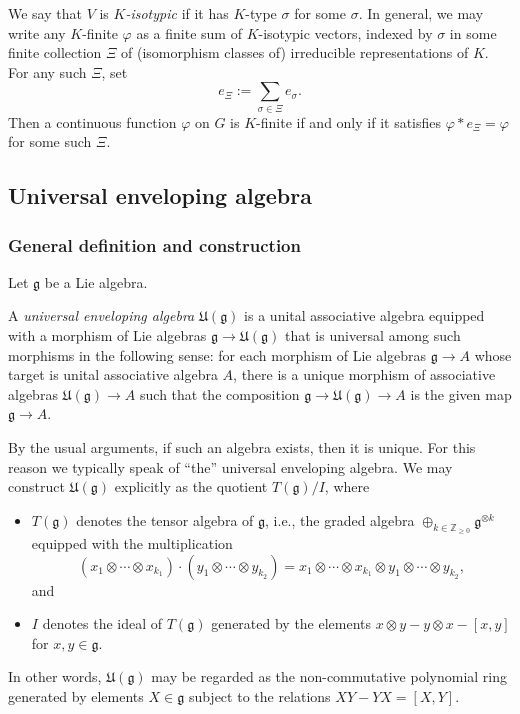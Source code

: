 \documentclass[reqno]{amsart} 
\begin{document}
We say that $V$ is \emph{$K$-isotypic} if it has $K$-type $\sigma$ for some $\sigma$.  In general, we may write any $K$-finite $\varphi$ as a finite sum of $K$-isotypic vectors, indexed by $\sigma$ in some finite collection $\Xi$ of (isomorphism classes of) irreducible representations of $K$.  For any such $\Xi$, set
\begin{equation*}
  e _{\Xi } := \sum _{\sigma \in \Xi } e _\sigma.
\end{equation*}
Then a continuous function $\varphi$ on $G$ is $K$-finite if and only if it satisfies $\varphi \ast e _{\Xi } = \varphi$ for some such $\Xi$.

\subsection{Universal enveloping algebra}\label{sec:univ-envel-algebra}

\subsubsection{General definition and construction}\label{sec:gener-defin-constr}

Let $\mathfrak{g}$ be a Lie algebra.
\begin{definition}
  A \emph{universal enveloping algebra} $\mathfrak{U}(\mathfrak{g})$ is a unital associative algebra equipped with a morphism of Lie algebras $\mathfrak{g} \rightarrow \mathfrak{U}(\mathfrak{g})$ that is universal among such morphisms in the following sense: for each morphism of Lie algebras $\mathfrak{g} \rightarrow A$ whose target is unital associative algebra $A$, there is a unique morphism of associative algebras $\mathfrak{U}(\mathfrak{g}) \rightarrow A$ such that the composition $\mathfrak{g} \rightarrow \mathfrak{U}(\mathfrak{g}) \rightarrow A$ is the given map $\mathfrak{g} \rightarrow A$.
\end{definition}
By the usual arguments, if such an algebra exists, then it is unique.  For this reason we typically speak of ``the'' universal enveloping algebra.  We may construct $\mathfrak{U}(\mathfrak{g})$ explicitly as the quotient $T(\mathfrak{g})/I$, where
\begin{itemize}
\item $T(\mathfrak{g})$ denotes the tensor algebra of $\mathfrak{g}$, i.e., the graded algebra $\oplus_{k \in \mathbb{Z}_{\geq 0}} \mathfrak{g}^{\otimes k}$ equipped with the multiplication
  \begin{equation*}
    (x_1 \otimes \dotsb \otimes x_{k_1}) \cdot (y_1 \otimes \dotsb \otimes y_{k_2}) = x_1 \otimes \dotsb \otimes x_{k_1} \otimes y_1 \otimes \dotsb \otimes y_{k_2},
  \end{equation*}
  and
\item $I$ denotes the ideal of $T(\mathfrak{g})$ generated by the elements $x \otimes y - y \otimes x - [x,y]$ for $x, y \in \mathfrak{g}$.
\end{itemize}
In other words, $\mathfrak{U}(\mathfrak{g})$ may be regarded as the non-commutative polynomial ring generated by elements $X \in \mathfrak{g}$ subject to the relations $X Y - Y X = [X,Y]$.
\end{document}
